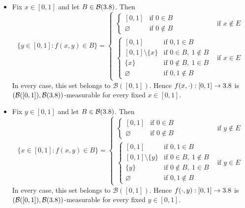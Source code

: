 \begin{example}
\begin{itemize}
\item
Fix $x \in [0,1]$ and let $B \in \mathcal{B}(3.8)$.
Then
\[
\{y\in[0,1] : f(x,y)\in B\}
=
\begin{cases}
\begin{cases}
[0,1] & \text{if } 0 \in B \\
\varnothing & \text{if } 0 \notin B
\end{cases}
& \text{if } x \notin E
\\[2em]
\begin{cases}
[0,1] & \text{if } 0,1 \in B \\
[0,1]\setminus\{x\} & \text{if } 0 \in B,\ 1 \notin B \\
\{x\} & \text{if } 0 \notin B,\ 1 \in B \\
\varnothing & \text{if } 0,1 \notin B
\end{cases}
& \text{if } x \in E
\end{cases}
\]
In every case, this set belongs to $\mathcal{B}([0,1])$.
Hence $f(x,\cdot) : [0,1]\to3.8$ is $(\mathcal{B}([0,1]),\mathcal{B}(3.8))$-measurable for every fixed $x\in[0,1]$.

\item
Fix $y \in [0,1]$ and let $B \in \mathcal{B}(3.8)$.
Then
\[
\{x\in[0,1] : f(x,y)\in B\}
=
\begin{cases}
\begin{cases}
[0,1] & \text{if } 0 \in B \\
\varnothing & \text{if } 0 \notin B
\end{cases}
& \text{if } y \notin E
\\[2em]
\begin{cases}
[0,1] & \text{if } 0,1 \in B \\
[0,1]\setminus\{y\} & \text{if } 0 \in B,\ 1 \notin B \\
\{y\} & \text{if } 0 \notin B,\ 1 \in B \\
\varnothing & \text{if } 0,1 \notin B
\end{cases}
& \text{if } y \in E
\end{cases}
\]
In every case, this set belongs to $\mathcal{B}([0,1])$.
Hence $f(\cdot,y) : [0,1]\to3.8$ is $(\mathcal{B}([0,1]),\mathcal{B}(3.8))$-measurable for every fixed $y\in[0,1]$.
\end{itemize}


\end{example}
